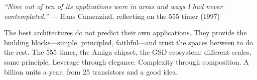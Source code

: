 \documentclass[11pt,letterpaper]{article}
\begin{document}
\vspace{1.5em}

\begin{quotebox}
\textit{``Nine out of ten of its applications were in areas and ways I had never contemplated.''} --- Hans Camenzind, reflecting on the 555 timer (1997)

\vspace{0.5em}

The best architectures do not predict their own applications. They provide the building blocks---simple, principled, faithful---and trust the spaces between to do the rest. The 555 timer, the Amiga chipset, the GSD ecosystem: different scales, same principle. Leverage through elegance. Complexity through composition. A billion units a year, from 25 transistors and a good idea.
\end{quotebox}
\end{document}
